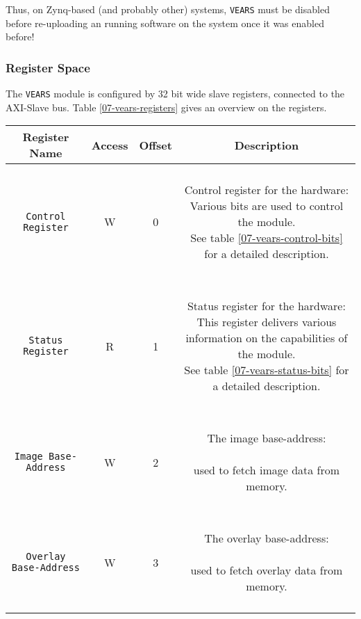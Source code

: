 Thus, on Zynq-based (and probably other) systems, \texttt{VEARS} must be disabled before re-uploading an running software on the system once it was enabled before!


\bigskip

\subsubsection{Register Space}

The \texttt{VEARS} module is configured by 32 bit wide slave registers, connected to the AXI-Slave bus.
Table \ref{07-vears-registers} gives an overview on the registers.

\begin{longtable}[htb]{|c|c|c|c|}
\hline 
\textbf{Register Name} & \textbf{Access} & \textbf{Offset} & \textbf{Description} \\
\hline
\endhead

\texttt{Control Register} & W & 0 &
\parbox{7cm}{ ~ \\ Control register for the hardware: \\ \small
Various bits are used to control the module.\\
See table \ref{07-vears-control-bits} for a detailed description.
\\ ~ } \\

\hline 

\texttt{Status Register} & R & 1 &
\parbox{7cm}{ ~ \\ Status register for the hardware: \\ \small
This register delivers various information on the capabilities of the module.\\
See table \ref{07-vears-status-bits} for a detailed description.
\\ ~ } \\

\hline 

\texttt{Image Base-Address} & W & 2 &
\parbox{7cm}{ ~ \\ The image base-address: \\ ~ \\ \small
used to fetch image data from memory.
\\ ~ } \\

\hline 

\texttt{Overlay Base-Address} & W & 3 &
\parbox{7cm}{ ~ \\ The overlay base-address: \\ ~ \\ \small
used to fetch overlay data from memory.
\\ ~ } \\


\end{longtable}
